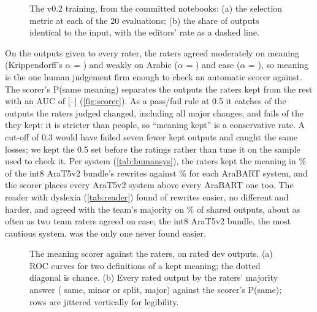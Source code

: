 \documentclass[10pt,a4paper]{article}
\begin{document}
\begin{figure}[h]
\centering
\figtrainingtwo
\caption{The v0.2 training, from the committed notebooks: (a) the selection metric
at each of the 20 evaluations; (b) the share of outputs identical to the input,
with the editors' rate as a dashed line.}
\label{fig:training2}
\end{figure}

 On the \hShared{} outputs
given to every rater, the raters agreed moderately on meaning (Krippendorff's
$\alpha$ = \hAlphaMeaning{}) and weakly on Arabic ($\alpha$ = \hAlphaArabic{}) and
ease ($\alpha$ = \hAlphaEase{}), so meaning is the one human judgement firm enough
to check an automatic scorer against. The scorer's P(same meaning) separates the
outputs the raters kept from the rest with an AUC of \hAucSame{}
[\hAucSameLo--\hAucSameHi] (\autoref{fig:scorer}). As a pass/fail rule at 0.5 it
catches \hCaught{} of the \hLosses{} outputs the raters judged changed, including
all \hMajorCaught{} major changes, and fails \hWrongFail{} of the \hKept{} they
kept: it is stricter than people, so ``meaning kept'' is a conservative rate. A
cut-off of 0.3 would have failed seven fewer kept outputs and caught the same
losses; we kept the 0.5 set before the ratings rather than tune it on the sample
used to check it. Per system (\autoref{tab:humansys}), the raters kept the meaning
in \hAppTfiveSame\% of the int8 AraT5v2 bundle's rewrites against \hBartSameMin\%
for each AraBART system, and the scorer places every AraT5v2 system above every
AraBART one too. The reader with dyslexia (\autoref{tab:reader}) found \rEasier{}
of \rN{} rewrites easier, \rSame{} no different and \rHarder{} harder, and agreed
with the team's majority on \rAgree\% of shared outputs, about as often as two team
raters agreed on ease; the int8 AraT5v2 bundle, the most cautious system, was the
only one never found easier.

\begin{figure}[h]
\centering
\figscorer
\caption{The meaning scorer against the raters, on \hRated{} rated dev outputs. (a)
ROC curves for two definitions of a kept meaning; the dotted diagonal is chance.
(b) Every rated output by the raters' majority answer (\hVerdictSame{} same,
\hVerdictMinor{} minor or split, \hVerdictMajor{} major) against the scorer's
P(same); rows are jittered vertically for legibility.}
\label{fig:scorer}
\end{figure}

\humansystable
\end{document}
